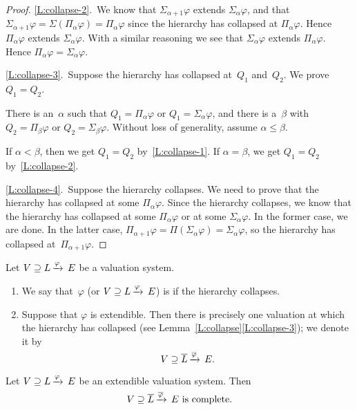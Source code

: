 \documentclass[main.tex]{subfiles}
\begin{document}
\begin{proof}
\noindent\ref{L:collapse-2}.\ 
We know that $\Sigma_{\alpha+1}\varphi$ extends $\Sigma_\alpha\varphi$,
and that $\Sigma_{\alpha+1}\varphi=\Sigma(\Pi_\alpha\varphi)=\Pi_\alpha\varphi$
since the hierarchy has collapsed at $\Pi_\alpha\varphi$.
Hence $\Pi_\alpha\varphi$ extends $\Sigma_\alpha\varphi$.
With a similar reasoning
we see that $\Sigma_\alpha\varphi$ extends $\Pi_\alpha\varphi$.
Hence $\Pi_\alpha\varphi = \Sigma_\alpha\varphi$.

\noindent\ref{L:collapse-3}.\ 
Suppose the hierarchy has collapsed at~$Q_1$ and~$Q_2$.
We prove $Q_1 = Q_2$.

There is an~$\alpha$ such that  $Q_1 = \Pi_\alpha \varphi$
or $Q_1 = \Sigma_\alpha\varphi$,
and there is a~$\beta$ with 
$Q_2 = \Pi_\beta \varphi$ or $Q_2 = \Sigma_\beta \varphi$.
Without loss of generality, assume $\alpha \leq \beta$.

If $\alpha < \beta$, then we get $Q_1 = Q_2$ by~\ref{L:collapse-1}.
If $\alpha=\beta$, we get $Q_1 = Q_2$ by~\ref{L:collapse-2}.

\noindent\ref{L:collapse-4}.\ 
Suppose the hierarchy collapses.
We need to prove that the hierarchy has collapsed at some $\Pi_\alpha \varphi$.
Since the hierarchy collapses,
we know that the hierarchy has collapsed 
at some $\Pi_\alpha \varphi$ or at some $\Sigma_\alpha\varphi$.
In the former case, we are done.
In the latter case, $\Pi_{\alpha+1} \varphi = \Pi(\Sigma_\alpha \varphi)
= \Sigma_\alpha\varphi$,
so the hierarchy has collapsed at~$\Pi_{\alpha+1}\varphi$.
\end{proof}
%
%
\begin{dfn}
\label{D:extendible}
Let $V \supseteq L\,\smash{\xrightarrow{\varphi}\,E}$ be a valuation system.
\begin{enumerate}
\item
\label{D:extendible-1}
We say that~$\varphi$ (or  $V \supseteq L\,\smash{\xrightarrow{\varphi}\,E}$) is 
if the hierarchy collapses.

\item
\label{D:extendible-2}
Suppose that $\varphi$ is extendible.
Then there is precisely one valuation
at which the hierarchy has collapsed
(see Lemma~\ref{L:collapse}\ref{L:collapse-3});
we denote it by
\begin{equation*}
V \supseteq \overline L\,\smash{\xrightarrow{\overline\varphi}\,E}.
\end{equation*}
\end{enumerate}
\end{dfn}
%
%
\begin{lem}
\label{L:complete}
Let $V \supseteq L\,\smash{\xrightarrow{\varphi}\,E}$ be an extendible valuation system.
Then
\begin{equation*}
V \supseteq \overline L\,\smash{\xrightarrow{\overline\varphi}\,E}
\text{ is complete.}
\end{equation*}
\end{lem}
\end{document}

